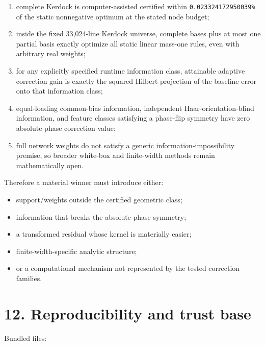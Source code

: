 \documentclass[
  10pt,
]{article}
\providecommand{\tightlist}{%
  \setlength{\itemsep}{0pt}\setlength{\parskip}{0pt}}
\begin{document}
\begin{enumerate}
\def\labelenumi{\arabic{enumi}.}
\tightlist
\item
  complete Kerdock is computer-assisted certified within
  \texttt{0.023324172950039\%} of the static nonnegative optimum at the
  stated node budget;
\item
  inside the fixed 33,024-line Kerdock universe, complete bases plus at
  most one partial basis exactly optimize all static linear mass-one
  rules, even with arbitrary real weights;
\item
  for any explicitly specified runtime information class, attainable
  adaptive correction gain is exactly the squared Hilbert projection of
  the baseline error onto that information class;
\item
  equal-loading common-bias information, independent
  Haar-orientation-blind information, and feature classes satisfying a
  phase-flip symmetry have zero absolute-phase correction value;
\item
  full network weights do not satisfy a generic
  information-impossibility premise, so broader white-box and
  finite-width methods remain mathematically open.
\end{enumerate}

Therefore a material winner must introduce either:

\begin{itemize}
\tightlist
\item
  support/weights outside the certified geometric class;
\item
  information that breaks the absolute-phase symmetry;
\item
  a transformed residual whose kernel is materially easier;
\item
  finite-width-specific analytic structure;
\item
  or a computational mechanism not represented by the tested correction
  families.
\end{itemize}

\section{12. Reproducibility and trust
base}\label{reproducibility-and-trust-base}

Bundled files:
\end{document}
